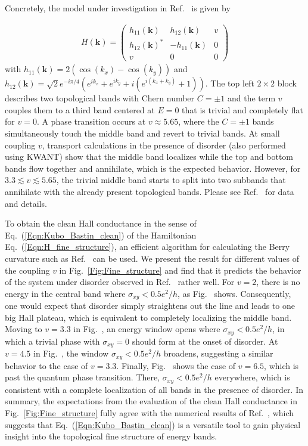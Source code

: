 \documentclass[aps,prb,amsmath,amssymb,twocolumn, superscriptaddress]{revtex4-2}
\newcommand{\eq}[1]{Eq.~(\ref{#1})}
\begin{document}
Concretely, the model under investigation in Ref.~\cite{Fine_structure_App} is given by

\begin{align}
H(\bm k) = \begin{pmatrix} 
h_{11}(\bm k) & h_{12}(\bm k) & v \\
h_{12}(\bm k) ^*&  -h_{11}(\bm k) & 0 \\
v & 0 & 0 
\end{pmatrix} \label{Eqn:H_fine_structure}
\end{align}
with $h_{11}(\bm k) = 2(\cos(k_x) - \cos(k_y))$ and $h_{12}(\bm k) = \sqrt{2} e^{- i \pi /4} (e^{i k_x} + e^{i k_y} + i \left(e^{i (k_x + k_y)} + 1 \right)) $. The top left $2\times 2$ block describes two topological bands with Chern number $C= \pm 1$ and the term $v$ couples them to a third band centered at $E = 0$ that is trivial and completely flat for $v= 0$. A phase transition occurs at $v \approx 5.65$, where the $C = \pm 1$ bands simultaneously touch the middle band and revert to trivial bands. At small coupling $v$, transport calculations in the presence of disorder (also performed using KWANT) show that the middle band localizes while the top and bottom bands flow together and annihilate, which is the expected behavior. However, for $3.3 \lesssim v \lesssim 5.65$, the trivial middle band starts to split into two subbands that annihilate with the already present topological bands. Please see Ref.~\cite{Fine_structure_App} for data and details. 

To obtain the clean Hall conductance in the sense of \eq{Eqn:Kubo_Bastin_clean} of the Hamiltonian \eq{Eqn:H_fine_structure}, an efficient algorithm for calculating the Berry curvature such as Ref.~\cite{Chern_number_numerically_App} can be used. We present the result for different values of the coupling $v$ in Fig.~\ref{Fig:Fine_structure} and find that it predicts the behavior of the system under disorder observed in Ref.~\cite{Fine_structure_App} rather well. For $v = 2$, there is no energy in the central band where $\sigma_{xy} < 0.5 e^2 / h$, as Fig.~ shows. Consequently, one would expect that disorder simply straightens out the line and leads to one big Hall plateau, which is equivalent to completely localizing the middle band. Moving to $v = 3.3$ in Fig.~, an energy window opens where $\sigma_{xy} < 0.5 e^2 / h$, in which a trivial phase with $\sigma_{xy} = 0$ should form at the onset of disorder. At $v = 4.5$ in Fig.~, the window $\sigma_{xy} < 0.5 e^2 / h$ broadens, suggesting a similar behavior to the case of $v = 3.3$. Finally, Fig.~ shows the case of $v = 6.5$, which is past the quantum phase transition. There, $\sigma_{xy} < 0.5 e^2 / h$ everywhere, which is consistent with a complete localization of all bands in the presence of disorder. In summary, the expectations from the evaluation of the clean Hall conductance in Fig.~\ref{Fig:Fine_structure} fully agree with the numerical results of Ref.~\cite{Fine_structure_App}, which suggests that \eq{Eqn:Kubo_Bastin_clean} is a versatile tool to gain physical insight into the topological fine structure of energy bands.
\end{document}
